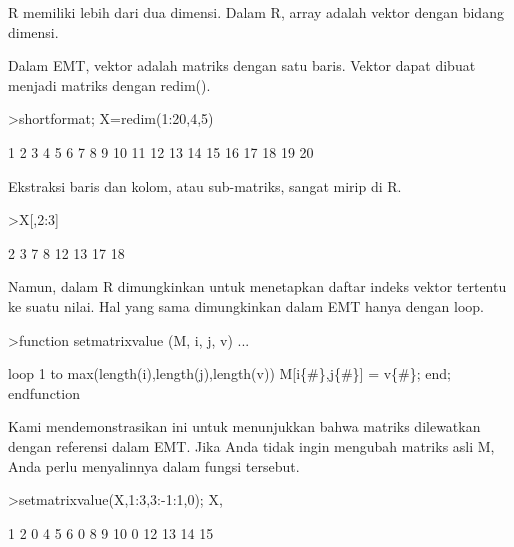 \documentclass[a4paper,10pt]{article}
\begin{document}
\begin{eulernotebook}
\begin{eulercomment}
R memiliki lebih dari dua dimensi. Dalam R, array adalah vektor dengan
bidang dimensi.

Dalam EMT, vektor adalah matriks dengan satu baris. Vektor dapat
dibuat menjadi matriks dengan redim().
\end{eulercomment}
\begin{eulerprompt}
>shortformat; X=redim(1:20,4,5)
\end{eulerprompt}
\begin{euleroutput}
          1         2         3         4         5 
          6         7         8         9        10 
         11        12        13        14        15 
         16        17        18        19        20 
\end{euleroutput}
\begin{eulercomment}
Ekstraksi baris dan kolom, atau sub-matriks, sangat mirip di R.
\end{eulercomment}
\begin{eulerprompt}
>X[,2:3]
\end{eulerprompt}
\begin{euleroutput}
          2         3 
          7         8 
         12        13 
         17        18 
\end{euleroutput}
\begin{eulercomment}
Namun, dalam R dimungkinkan untuk menetapkan daftar indeks vektor
tertentu ke suatu nilai. Hal yang sama dimungkinkan dalam EMT hanya
dengan loop.
\end{eulercomment}
\begin{eulerprompt}
>function setmatrixvalue (M, i, j, v) ...
\end{eulerprompt}
\begin{eulerudf}
  loop 1 to max(length(i),length(j),length(v))
     M[i\{#\},j\{#\}] = v\{#\};
  end;
  endfunction
\end{eulerudf}
\begin{eulercomment}
Kami mendemonstrasikan ini untuk menunjukkan bahwa matriks dilewatkan
dengan referensi dalam EMT. Jika Anda tidak ingin mengubah matriks
asli M, Anda perlu menyalinnya dalam fungsi tersebut.
\end{eulercomment}
\begin{eulerprompt}
>setmatrixvalue(X,1:3,3:-1:1,0); X,
\end{eulerprompt}
\begin{euleroutput}
          1         2         0         4         5 
          6         0         8         9        10 
          0        12        13        14        15 

\end{euleroutput}
\end{eulernotebook}
\end{document}
